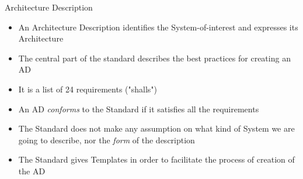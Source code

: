 		\begin{frame}
			\begin{block}{Architecture Description}
				\begin{itemize}
				\vspace{0.3cm}
					\item An Architecture Description identifies the System-of-interest and expresses its Architecture
					\vspace{0.3cm}
					\item The central part of the standard describes the best practices for creating an AD
\vspace{0.3cm}				
					\item It is a list of 24 requirements ("shalls")
\vspace{0.3cm}				
					\item An AD \emph{conforms} to the Standard if it satisfies all the requirements
\vspace{0.3cm}					
					\item The Standard does not make any assumption on what kind of System we are going to describe, nor the \emph{form} of the description
					\vspace{0.3cm}
					\item The Standard gives Templates in order to facilitate the process of creation of the AD
					\vspace{0.3cm}
				\end{itemize}
			\end{block}
		\end{frame}				
		
